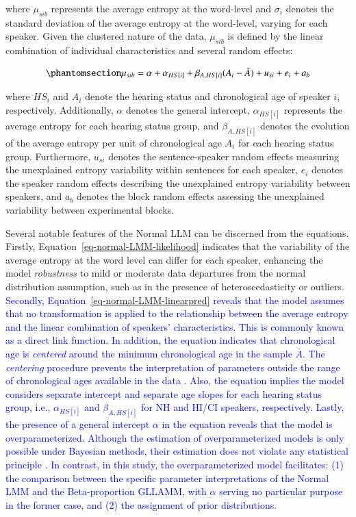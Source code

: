 \documentclass[
  authoryear,
  preprint,
  1p]{elsarticle}
\begin{document}
where \(\mu_{sib}\) represents the average entropy at the word-level and
\(\sigma_{i}\) denotes the standard deviation of the average entropy at
the word-level, varying for each speaker. Given the clustered nature of
the data, \(\mu_{sib}\) is defined by the linear combination of
individual characteristics and several random effects:

\begin{equation}\phantomsection\label{eq-normal-LMM-linearpred}{
\mu_{sib} = \alpha + \alpha_{HS[i]} + \beta_{A, HS[i]} (A_{i} - \bar{A}) + u_{si} + e_{i} + a_{b}
}\end{equation}

where \(HS_{i}\) and \(A_{i}\) denote the hearing status and
chronological age of speaker \(i\), respectively. Additionally,
\(\alpha\) denotes the general intercept, \(\alpha_{HS[i]}\) represents
the average entropy for each hearing status group, and
\(\beta_{A,HS[i]}\) denotes the evolution of the average entropy per
unit of chronological age \(A_{i}\) for each hearing status group.
Furthermore, \(u_{si}\) denotes the sentence-speaker random effects
measuring the unexplained entropy variability within sentences for each
speaker, \(e_{i}\) denotes the speaker random effects describing the
unexplained entropy variability between speakers, and \(a_{b}\) denotes
the block random effects assessing the unexplained variability between
experimental blocks.

Several notable features of the Normal LLM can be discerned from the
equations. Firstly, Equation~\ref{eq-normal-LMM-likelihood} indicates
that the variability of the average entropy at the word level can differ
for each speaker, enhancing the model \emph{robustness} to mild or
moderate data departures from the normal distribution assumption, such
as in the presence of heteroscedasticity or outliers. \textcolor{blue}{Secondly,
Equation~\ref{eq-normal-LMM-linearpred} reveals that the model assumes
that no transformation is applied to the relationship between the
average entropy and the linear combination of speakers' characteristics.
This is commonly known as a direct link function. In addition, the
equation indicates that chronological age is \emph{centered} around the
minimum chronological age in the sample \(\bar{A}\). The
\emph{centering} procedure prevents the interpretation of parameters
outside the range of chronological ages available in the data
\citep{Everitt_et_al_2010}. Also, the equation implies the model
considers separate intercept and separate age slopes for each hearing
status group, i.e., \(\alpha_{HS[i]}\) and \(\beta_{A, HS[i]}\) for NH
and HI/CI speakers, respectively. Lastly, the presence of a general
intercept \(\alpha\) in the equation reveals that the model is
overparameterized. Although the estimation of overparameterized models
is only possible under Bayesian methods, their estimation does not
violate any statistical principle \citep[pp.~345]{McElreath_2020}. In
contrast, in this study, the overparameterized model facilitates: (1)
the comparison between the specific parameter interpretations of the
Normal LMM and the Beta-proportion GLLAMM, with \(\alpha\) serving no
particular purpose in the former case, and (2) the assignment of prior
distributions.}
\end{document}
